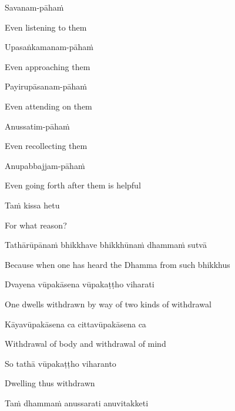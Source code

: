 Savanam-pāhaṁ

\begin{cprenglish}
Even listening to them
\end{cprenglish}

Upasaṅkamanam-pāhaṁ

\begin{cprenglish}
Even approaching them
\end{cprenglish}

Payirupāsanam-pāhaṁ

\begin{cprenglish}
Even attending on them
\end{cprenglish}

Anussatim-pāhaṁ

\begin{cprenglish}
Even recollecting them
\end{cprenglish}

Anupabbajjam-pāhaṁ

\begin{cprenglish}
Even going forth after them is helpful
\end{cprenglish}

Taṁ kissa hetu

\begin{cprenglish}
For what reason?
\end{cprenglish}

Tathārūpānaṁ bhikkhave bhikkhūnaṁ dhammaṁ sutvā

\begin{cprenglish}
Because when one has heard the Dhamma from such bhikkhus
\end{cprenglish}

Dvayena vūpakāsena vūpakaṭṭho viharati

\begin{cprenglish}
One dwells withdrawn by way of two kinds of withdrawal
\end{cprenglish}

Kāyavūpakāsena ca cittavūpakāsena ca

\begin{cprenglish}
Withdrawal of body and withdrawal of mind
\end{cprenglish}

So tathā vūpakaṭṭho viharanto

\begin{cprenglish}
Dwelling thus withdrawn
\end{cprenglish}

Taṁ dhammaṁ anussarati anuvitakketi


